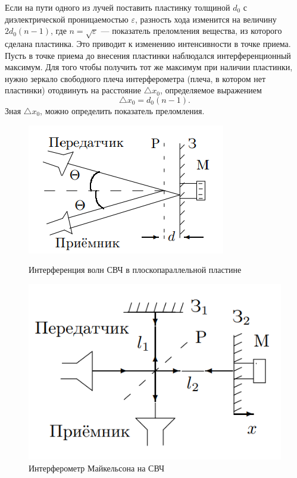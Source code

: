 \documentclass[a4paper, 12pt]{article}
\begin{document}
Если на пути одного из лучей поставить пластинку толщиной $d_0$ с диэлектрической проницаемостью $\varepsilon$, разность хода изменится
на величину $2 d_0 (n-1)$, где $n = \sqrt{\varepsilon}$ ---
показатель преломления вещества,
из которого сделана пластинка. Это
приводит к изменению интенсивности в точке приема. Пусть в точке приема до внесения пластинки наблюдался интерференционный максимум. Для того чтобы получить тот же максимум при наличии пластинки, нужно зеркало свободного плеча интерферометра (плеча, в котором нет пластинки) отодвинуть на расстояние $\triangle x_0$, определяемое выражением
\begin{equation}
    \triangle x_0 = d_0 (n-1).
\end{equation}
Зная $\triangle x_0$, можно определить показатель преломления.

\begin{figure}[h!]
\begin{center}
\begin{minipage}[h]{0.45\linewidth}
\includegraphics[width=1\linewidth]{fig2.PNG}
\caption{Интерференция волн СВЧ в плоскопараллельной пластине} %
\label{ris:experimoriginal} %
\end{minipage}
\hfill 
\begin{minipage}[h!]{0.45\linewidth}
\includegraphics[width=1\linewidth]{fig3.PNG}
\caption{Интерферометр Майкельсона на СВЧ}
\label{ris:experimcoded}
\end{minipage}
\end{center}
\end{figure}
\end{document}
